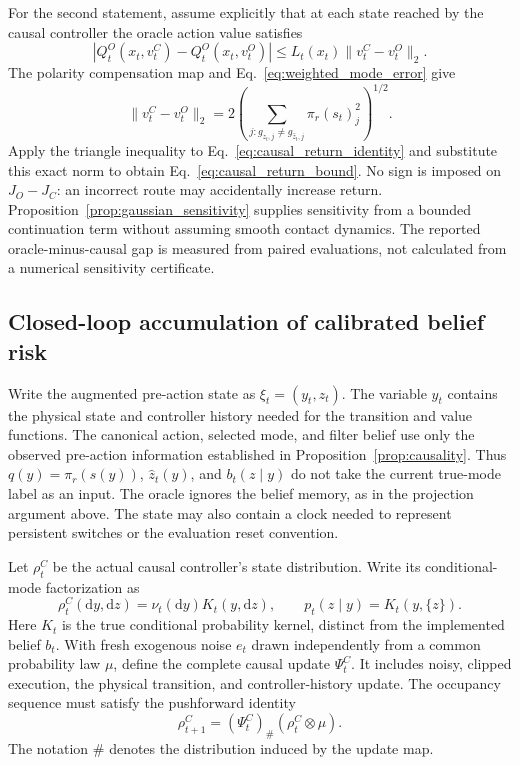 For the second statement, assume explicitly that at each state reached by the causal controller the oracle action value satisfies
\begin{equation}
 |Q_t^O(x_t,v_t^C)-Q_t^O(x_t,v_t^O)|
 \leq L_t(x_t)\|v_t^C-v_t^O\|_2.
\end{equation}
The polarity compensation map and Eq.~\eqref{eq:weighted_mode_error} give
\begin{equation}
 \|v_t^C-v_t^O\|_2
 =2\left(\sum_{j:g_{z_t,j}\ne g_{\hat z_t,j}}
 \pi_r(s_t)_j^2\right)^{1/2}.
\end{equation}
Apply the triangle inequality to Eq.~\eqref{eq:causal_return_identity} and substitute this exact norm to obtain Eq.~\eqref{eq:causal_return_bound}. No sign is imposed on $J_O-J_C$: an incorrect route may accidentally increase return. Proposition~\ref{prop:gaussian_sensitivity} supplies sensitivity from a bounded continuation term without assuming smooth contact dynamics. The reported oracle-minus-causal gap is measured from paired evaluations, not calculated from a numerical sensitivity certificate.

\subsection{Closed-loop accumulation of calibrated belief risk}
\label{app:closed_loop_belief}

Write the augmented pre-action state as $\xi_t=(y_t,z_t)$.
The variable $y_t$ contains the physical state and controller history needed for the transition and value functions.
The canonical action, selected mode, and filter belief use only the observed pre-action information established in Proposition~\ref{prop:causality}.
Thus $q(y)=\pi_r(s(y))$, $\hat z_t(y)$, and $b_t(z\mid y)$ do not take the current true-mode label as an input.
The oracle ignores the belief memory, as in the projection argument above.
The state may also contain a clock needed to represent persistent switches or the evaluation reset convention.

Let $\rho_t^C$ be the actual causal controller's state distribution.
Write its conditional-mode factorization as
\begin{equation}
 \rho_t^C(\mathrm dy,\mathrm dz)=\nu_t(\mathrm dy)K_t(y,\mathrm dz),
 \qquad p_t(z\mid y)=K_t(y,\{z\}).
 \label{eq:closed_loop_mode_law}
\end{equation}
Here $K_t$ is the true conditional probability kernel, distinct from the implemented belief $b_t$.
With fresh exogenous noise $e_t$ drawn independently from a common probability law $\mu$, define the complete causal update $\Psi_t^C$.
It includes noisy, clipped execution, the physical transition, and controller-history update.
The occupancy sequence must satisfy the pushforward identity
\begin{equation}
 \rho_{t+1}^C=(\Psi_t^C)_\#(\rho_t^C\otimes\mu).
 \label{eq:closed_loop_occupancy_flow}
\end{equation}
The notation $\#$ denotes the distribution induced by the update map.

